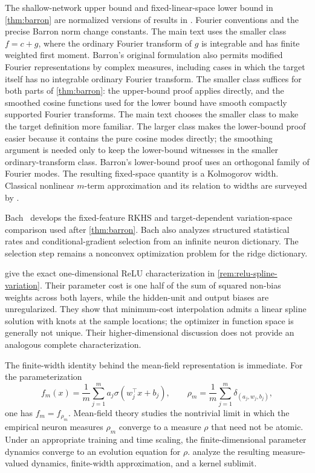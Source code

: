 \documentclass[11pt,twoside]{article}
\theoremstyle{definition}
\theoremstyle{remark}
\begin{document}
The shallow-network upper bound and fixed-linear-space lower bound in
\cref{thm:barron} are normalized versions of results in
\citet{barron1993}. Fourier conventions and the precise Barron norm change
constants. The main text uses the smaller class \(f=c+g\), where the ordinary
Fourier transform of \(g\) is integrable and has finite weighted first moment.
Barron's original formulation also permits modified Fourier representations
by complex measures, including cases in which the target itself has no
integrable ordinary Fourier transform. The smaller class suffices for both
parts of \cref{thm:barron}: the upper-bound proof applies directly, and the
smoothed cosine functions used for the lower bound have smooth compactly
supported Fourier transforms. The main text chooses the smaller class to make
the target definition more familiar. The larger class makes the lower-bound
proof easier because it contains the pure cosine modes directly; the smoothing
argument is needed only to keep the lower-bound witnesses in the smaller
ordinary-transform class.
Barron's lower-bound proof uses an orthogonal family of Fourier modes. The
resulting fixed-space quantity is a Kolmogorov width. Classical nonlinear
\(m\)-term approximation and its relation to widths are surveyed by
\citet{devore1998}.

Bach~\citep{bach2017} develops the fixed-feature RKHS and target-dependent
variation-space comparison used after \cref{thm:barron}. Bach also
analyzes structured statistical rates and conditional-gradient selection from
an infinite neuron dictionary. The selection step remains a nonconvex
optimization problem for the ridge dictionary.

\citet{savarese2019} give the exact one-dimensional ReLU characterization in
\cref{rem:relu-spline-variation}. Their parameter cost is one half of the sum
of squared non-bias weights across both layers, while the hidden-unit and
output biases are unregularized. They show that minimum-cost interpolation
admits a linear spline solution with knots at the sample locations; the
optimizer in function space is generally not unique. Their higher-dimensional
discussion does not provide an analogous complete characterization.

The finite-width identity behind the mean-field representation is immediate.
For the parameterization
\begin{equation*}
 f_m(x)=\frac1m\sum_{j=1}^m
 a_j\sigma(w_j^\top x+b_j),
 \qquad
 \rho_m=\frac1m\sum_{j=1}^m\delta_{(a_j,w_j,b_j)},
\end{equation*}
one has $f_m=f_{\rho_m}$. Mean-field theory studies the nontrivial limit in
which the empirical neuron measures $\rho_m$ converge to a measure $\rho$
that need not be atomic. Under an appropriate training and time scaling, the
finite-dimensional parameter dynamics converge to an evolution equation for
$\rho$. \citet{mei2019} analyze the resulting measure-valued dynamics,
finite-width approximation, and a kernel sublimit.
\end{document}
